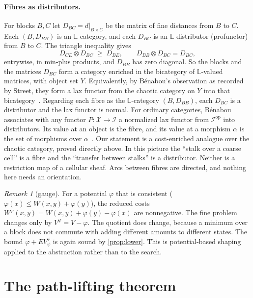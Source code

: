 \documentclass[11pt]{article}
\theoremstyle{definition}
\theoremstyle{remark}
\newtheorem{remark}[theorem]{Remark}
\newcommand{\Lq}{\mathbb{L}}           %
\newcommand{\dd}{d}
\begin{document}
\paragraph{Fibres as distributors.}
For blocks $B, C$ let $D_{BC} = \dd|_{B \times C}$ be the matrix of fine distances
from $B$ to $C$. Each $(B, D_{BB})$ is an $\Lq$-category, and each $D_{BC}$ is an
$\Lq$-distributor (profunctor) from $B$ to $C$. The triangle inequality gives
\[
D_{CE} \otimes D_{BC} \;\ge\; D_{BE}, \qquad D_{BB} \otimes D_{BC} = D_{BC},
\]
entrywise, in min-plus products, and $D_{BB}$ has zero diagonal. So the blocks
and the matrices $D_{BC}$ form a category enriched in the bicategory of
$\Lq$-valued matrices, with object set $Y$. Equivalently, by Bénabou's
observation as recorded by Street, they form a lax functor from the chaotic
category on $Y$ into that bicategory~\cite{street1983}. Regarding each fibre as
the $\Lq$-category $(B, D_{BB})$, each $D_{BC}$ is a distributor and the lax
functor is normal. For ordinary categories, Bénabou associates with any functor
$P : \mathcal X \to \mathcal I$ a normalized lax functor from
$\mathcal I^{\mathrm{op}}$ into distributors. Its value at an object is the fibre,
and its value at a morphism $\alpha$ is the set of morphisms over
$\alpha$~\cite{benabou2000}. Our statement is a cost-enriched analogue over the
chaotic category, proved directly above. In this picture the ``stalk over a coarse
cell'' is a fibre and the ``transfer between stalks'' is a distributor. Neither is
a restriction map of a cellular sheaf. Arcs between fibres are directed, and
nothing here needs an orientation.

\begin{remark}[gauge]
For a potential $\varphi$ that is consistent ($\varphi(x) \le W(x,y) + \varphi(y)$),
the reduced costs $W^\varphi(x,y) = W(x,y) + \varphi(y) - \varphi(x)$ are
nonnegative. The fine problem changes only by $V^\varphi = V - \varphi$. The quotient
does change, because a minimum over a block does not commute with adding
different amounts to different states. The bound $\varphi + E V^\varphi_\psi$ is
again sound by \cref{prop:lower}. This is potential-based shaping~\cite{ng1999}
applied to the abstraction rather than to the search.
\end{remark}

\section{The path-lifting theorem}\label{sec:lifting}
\end{document}
